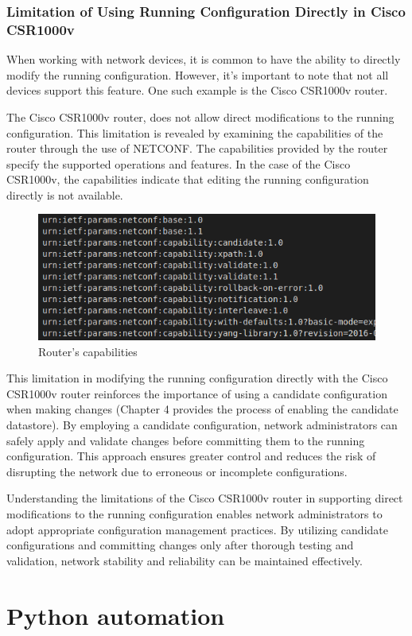 \subsubsection{Limitation of Using Running Configuration Directly in Cisco CSR1000v}

When working with network devices, it is common to have the ability to directly modify the running configuration. However, it's important to note that not all devices support this feature. One such example is the Cisco CSR1000v router.

The Cisco CSR1000v router, does not allow direct modifications to the running configuration. This limitation is revealed by examining the capabilities of the router through the use of NETCONF. The capabilities provided by the router specify the supported operations and features. In the case of the Cisco CSR1000v, the capabilities indicate that editing the running configuration directly is not available.
\begin{figure}[h]
  \centering
  \includegraphics[width=0.6\linewidth]{Images/candidate_datastore.png}
  \caption{Router's capabilities}
\end{figure}

This limitation in modifying the running configuration directly with the Cisco CSR1000v router reinforces the importance of using a candidate configuration when making changes (Chapter 4 provides the process of enabling the candidate datastore). By employing a candidate configuration, network administrators can safely apply and validate changes before committing them to the running configuration. This approach ensures greater control and reduces the risk of disrupting the network due to erroneous or incomplete configurations.

Understanding the limitations of the Cisco CSR1000v router in supporting direct modifications to the running configuration enables network administrators to adopt appropriate configuration management practices. By utilizing candidate configurations and committing changes only after thorough testing and validation, network stability and reliability can be maintained effectively.

\section{Python automation}
